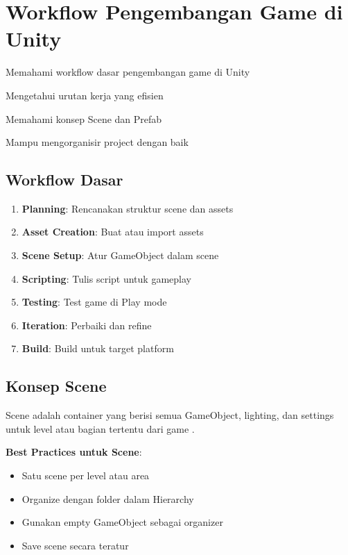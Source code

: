
\section{Workflow Pengembangan Game di Unity}

\begin{learningoutcomes}
\item Memahami workflow dasar pengembangan game di Unity
\item Mengetahui urutan kerja yang efisien
\item Memahami konsep Scene dan Prefab
\item Mampu mengorganisir project dengan baik
\end{learningoutcomes}

\subsection{Workflow Dasar}

\begin{enumerate}
\item \textbf{Planning}: Rencanakan struktur scene dan assets
\item \textbf{Asset Creation}: Buat atau import assets
\item \textbf{Scene Setup}: Atur GameObject dalam scene
\item \textbf{Scripting}: Tulis script untuk gameplay
\item \textbf{Testing}: Test game di Play mode
\item \textbf{Iteration}: Perbaiki dan refine
\item \textbf{Build}: Build untuk target platform
\end{enumerate}

\subsection{Konsep Scene}

\begin{definisi}[Scene]
Scene adalah container yang berisi semua GameObject, lighting, dan settings untuk level atau bagian tertentu dari game \cite{UnityManual2024}.
\end{definisi}

\textbf{Best Practices untuk Scene}:
\begin{itemize}
\item Satu scene per level atau area
\item Organize dengan folder dalam Hierarchy
\item Gunakan empty GameObject sebagai organizer
\item Save scene secara teratur
\end{itemize}

